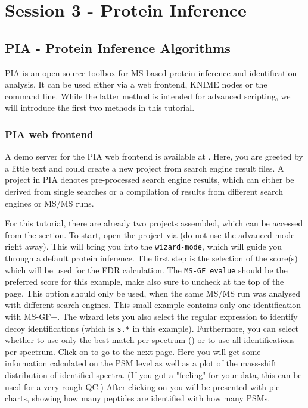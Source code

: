 
\section{Session 3 - Protein Inference}
\label{Session 3 - Protein inference}

\subsection{PIA - Protein Inference Algorithms}
PIA is an open source toolbox for MS based protein inference and identification analysis. It can be used either via a web frontend, KNIME nodes or the command line. While the latter method is intended for advanced scripting, we will introduce the first two methods in this tutorial.

\subsubsection{PIA web frontend}
A demo server for the PIA web frontend is available at . Here, you are greeted by a little text and could create a new project from search engine result files. A project in PIA denotes pre-processed search engine results, which can either be derived from single searches or a compilation of results from different search engines or MS/MS runs.

For this tutorial, there are already two projects assembled, which can be accessed from the  section. To start, open the project  via  (do not use the advanced mode right away). This will bring you into the \texttt{wizard-mode}, which will guide you through a default protein inference. The first step is the selection of the score(s) which will be used for the FDR calculation. The \texttt{MS-GF evalue} should be the preferred score for this example, make also sure to uncheck  at the top of the page. This option should only be used, when the same MS/MS run was analysed with different search engines. This small example contains only one identification with MS-GF+. The wizard lets you also select the regular expression to identify decoy identifications (which is \texttt{s.*} in this example). Furthermore, you can select whether to use only the best match per spectrum () or to use all identifications per spectrum. Click on  to go to the next page. Here you will get some information calculated on the PSM level as well as a plot of the mass-shift distribution of identified spectra. (If you got a "feeling" for your data, this can be used for a very rough QC.) After clicking on  you will be presented with pie charts, showing how many peptides are identified with how many PSMs.

